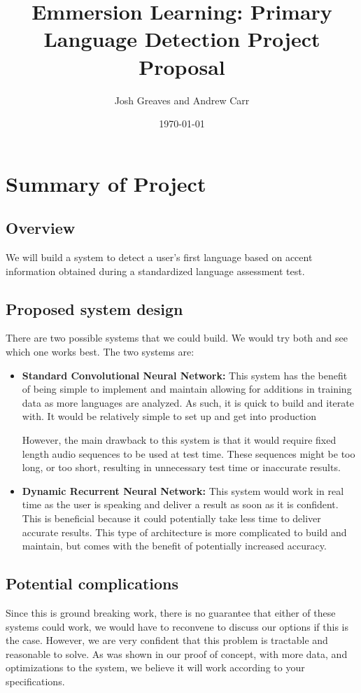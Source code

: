 \documentclass[dvips,12pt]{article}
\begin{document}
\title{Emmersion Learning: Primary Language Detection Project Proposal}
\author{Josh Greaves and Andrew Carr}
\date{\today}

\maketitle

\section{Summary of Project}

\subsection{Overview}
We will build a system to detect a user's first language based on accent information obtained during a standardized language assessment test. 

\subsection{Proposed system design}
There are two possible systems that we could build. We would try both and see which one works best. The two systems are:

\begin{itemize}
\item \textbf{Standard Convolutional Neural Network:}
This system has the benefit of being simple to implement and maintain allowing for additions in training data as more languages are analyzed. As such, it is quick to build and iterate with. It would be relatively simple to set up and get into production

However, the main drawback to this system is that it would require fixed length audio sequences to be used at test time. These sequences might be too long, or too short, resulting in unnecessary test time or inaccurate results. 

\item \textbf{Dynamic Recurrent Neural Network:}
This system would work in real time as the user is speaking and deliver a result as soon as it is confident. This is beneficial because it could potentially take less time to deliver accurate results.
This type of architecture is more complicated to build and maintain, but comes with the benefit of potentially increased accuracy. 
\end{itemize}

\subsection{Potential complications}
Since this is ground breaking work, there is no guarantee that either of these systems could work, we would have to reconvene to discuss our options if this is the case. However, we are very confident that this problem is tractable and reasonable to solve. As was shown in our proof of concept, with more data, and optimizations to the system, we believe it will work according to your specifications.
\end{document}
